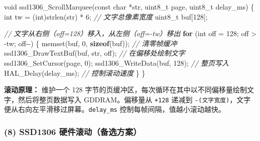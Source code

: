 \documentclass[
  chinese,
  UTF8,
  oneside,
  openany]{ctexbook}
\newenvironment{Shaded}{}{}
\newcommand{\CommentTok}[1]{\textcolor[rgb]{0.38,0.63,0.69}{\textit{#1}}}
\newcommand{\ControlFlowTok}[1]{\textcolor[rgb]{0.00,0.44,0.13}{\textbf{#1}}}
\newcommand{\DataTypeTok}[1]{\textcolor[rgb]{0.56,0.13,0.00}{#1}}
\newcommand{\DecValTok}[1]{\textcolor[rgb]{0.25,0.63,0.44}{#1}}
\newcommand{\KeywordTok}[1]{\textcolor[rgb]{0.00,0.44,0.13}{\textbf{#1}}}
\newcommand{\NormalTok}[1]{#1}
\newcommand{\OperatorTok}[1]{\textcolor[rgb]{0.40,0.40,0.40}{#1}}
\begin{document}
\begin{Shaded}
\begin{Highlighting}[]
\DataTypeTok{void}\NormalTok{ ssd1306\_ScrollMarquee}\OperatorTok{(}\DataTypeTok{const} \DataTypeTok{char} \OperatorTok{*}\NormalTok{str}\OperatorTok{,} \DataTypeTok{uint8\_t}\NormalTok{ page}\OperatorTok{,} \DataTypeTok{uint8\_t}\NormalTok{ delay\_ms}\OperatorTok{)}
\OperatorTok{\{}
    \DataTypeTok{int}\NormalTok{ tw }\OperatorTok{=} \OperatorTok{(}\DataTypeTok{int}\OperatorTok{)}\NormalTok{strlen}\OperatorTok{(}\NormalTok{str}\OperatorTok{)} \OperatorTok{*} \DecValTok{6}\OperatorTok{;}  \CommentTok{// 文字总像素宽度}
    \DataTypeTok{uint8\_t}\NormalTok{ buf}\OperatorTok{[}\DecValTok{128}\OperatorTok{];}

    \CommentTok{// 文字从右侧（off=128）移入，从左侧（off={-}tw）移出}
    \ControlFlowTok{for} \OperatorTok{(}\DataTypeTok{int}\NormalTok{ off }\OperatorTok{=} \DecValTok{128}\OperatorTok{;}\NormalTok{ off }\OperatorTok{\textgreater{}} \OperatorTok{{-}}\NormalTok{tw}\OperatorTok{;}\NormalTok{ off}\OperatorTok{{-}{-})} \OperatorTok{\{}
\NormalTok{        memset}\OperatorTok{(}\NormalTok{buf}\OperatorTok{,} \DecValTok{0}\OperatorTok{,} \KeywordTok{sizeof}\OperatorTok{(}\NormalTok{buf}\OperatorTok{));}           \CommentTok{// 清零帧缓冲}
\NormalTok{        ssd1306\_DrawTextBuf}\OperatorTok{(}\NormalTok{buf}\OperatorTok{,}\NormalTok{ str}\OperatorTok{,}\NormalTok{ off}\OperatorTok{);}    \CommentTok{// 在偏移处绘制文字}
\NormalTok{        ssd1306\_SetCursor}\OperatorTok{(}\NormalTok{page}\OperatorTok{,} \DecValTok{0}\OperatorTok{);}
\NormalTok{        ssd1306\_WriteData}\OperatorTok{(}\NormalTok{buf}\OperatorTok{,} \DecValTok{128}\OperatorTok{);}           \CommentTok{// 整页写入}
\NormalTok{        HAL\_Delay}\OperatorTok{(}\NormalTok{delay\_ms}\OperatorTok{);}                   \CommentTok{// 控制滚动速度}
    \OperatorTok{\}}
\OperatorTok{\}}
\end{Highlighting}
\end{Shaded}

\textbf{滚动原理：} 维护一个 128
字节的页缓冲区，每次循环在其中以不同偏移量绘制文字，然后将整页数据写入
GDDRAM。偏移量从 \texttt{+128} 递减到
\texttt{-(文字宽度)}，文字便从右向左平滑移过屏幕。\texttt{delay\_ms}
控制每帧间隔，值越小滚动越快。

\subsubsection{(8) SSD1306
硬件滚动（备选方案）}\label{ssd1306-ux786cux4ef6ux6edaux52a8ux5907ux9009ux65b9ux6848}
\end{document}
